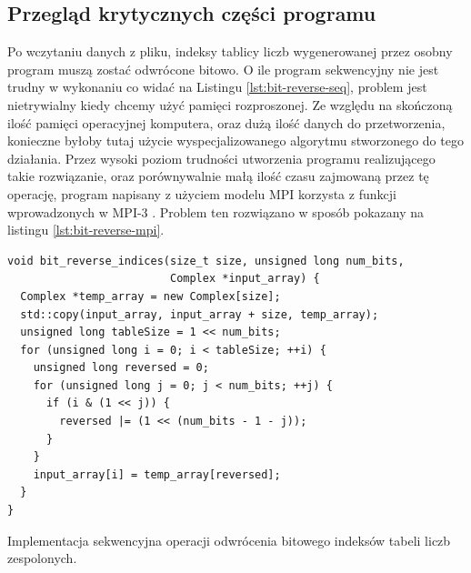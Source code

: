 \documentclass[a4paper,12pt]{book} %
\begin{document}
\subsection{Przegląd krytycznych części programu}
Po wczytaniu danych z pliku, indeksy tablicy liczb wygenerowanej przez osobny program muszą zostać odwrócone bitowo. O ile program sekwencyjny nie jest trudny w wykonaniu co widać na Listingu \ref{lst:bit-reverse-seq}, problem jest nietrywialny kiedy chcemy użyć pamięci rozproszonej. Ze względu na skończoną ilość pamięci operacyjnej komputera, oraz dużą ilość danych do przetworzenia, konieczne byłoby tutaj użycie wyspecjalizowanego algorytmu stworzonego do tego działania. Przez wysoki poziom trudności utworzenia programu realizującego takie rozwiązanie, oraz porównywalnie małą ilość czasu zajmowaną przez tę operację, program napisany z użyciem modelu MPI korzysta z funkcji wprowadzonych w MPI-3 \cite{mpi41}. Problem ten rozwiązano w sposób pokazany na listingu \ref{lst:bit-reverse-mpi}.

\begin{lstfloat}
\lstset{language=C++}
\begin{lstlisting}[frame=single]
void bit_reverse_indices(size_t size, unsigned long num_bits,
                         Complex *input_array) {
  Complex *temp_array = new Complex[size];
  std::copy(input_array, input_array + size, temp_array);
  unsigned long tableSize = 1 << num_bits;
  for (unsigned long i = 0; i < tableSize; ++i) {
    unsigned long reversed = 0;
    for (unsigned long j = 0; j < num_bits; ++j) {
      if (i & (1 << j)) {
        reversed |= (1 << (num_bits - 1 - j));
      }
    }
    input_array[i] = temp_array[reversed];
  }
}
\end{lstlisting}
\caption{Implementacja sekwencyjna operacji odwrócenia bitowego indeksów tabeli liczb zespolonych.}
\label{lst:bit-reverse-seq}
\end{lstfloat}
\end{document}
